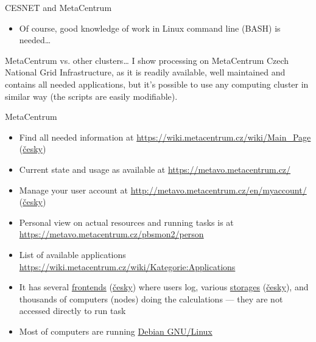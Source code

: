 \documentclass[compress, ucs, xelatex, 11pt, xcolor=x11names, aspectratio=169,
	hyperref={
		bookmarks=true,
		unicode=true,
		colorlinks=true,
		pdftitle={HybSeq course},
		plainpages=false,
		pdfauthor={Vojtech Zeisek},
		pdfsubject={Practical processing of HybSeq target enrichment sequencing data on computing grids like MetaCentrum},
		pdfcreator={XeLaTeX},
		pdfkeywords={BASH, command line, GNU, HybSeq, Linux, MetaCentrum, sequencing shell, target enrichment},
		linkcolor=Turquoise4, %
		anchorcolor=DodgerBlue4, %
		citecolor=DodgerBlue4, %
		filecolor=DodgerBlue4, %
		menucolor=Tan4, %
		urlcolor=DarkOliveGreen4, %
		pdftex},
	url={hyphens, lowtilde} %
	]{beamer}
\begin{document}
\begin{frame}[allowframebreaks]{CESNET and MetaCentrum}
\begin{itemize}
		\item Of course, good knowledge of work in Linux command line (BASH) is needed\ldots
	\end{itemize}
	\vfill
	\begin{alertblock}{MetaCentrum vs. other clusters\ldots}
		I show processing on MetaCentrum Czech National Grid Infrastructure, as it is readily available, well maintained and contains all needed applications, but it's possible to use any computing cluster in similar way (the scripts are easily modifiable).
	\end{alertblock}
	\vfill
\end{frame}

\begin{frame}{MetaCentrum}
	\begin{itemize}
		\item Find all needed information at \url{https://wiki.metacentrum.cz/wiki/Main_Page} (\href{https://wiki.metacentrum.cz/wiki/Hlavn\%C3\%AD_strana}{česky})
		\item Current state and usage as available at \url{https://metavo.metacentrum.cz/}
		\item Manage your user account at \url{http://metavo.metacentrum.cz/en/myaccount/} (\href{https://metavo.metacentrum.cz/cs/myaccount/}{česky})
		\item Personal view on actual resources and running tasks is at \url{https://metavo.metacentrum.cz/pbsmon2/person}
		\item List of available applications \url{https://wiki.metacentrum.cz/wiki/Kategorie:Applications}
		\item It has several \href{https://wiki.metacentrum.cz/wiki/Frontend}{frontends} (\href{https://wiki.metacentrum.cz/wiki/Celni_uzel}{česky}) where users log, various \href{https://wiki.metacentrum.cz/wiki/Working_with_data}{storages} (\href{https://wiki.metacentrum.cz/wiki/Prace_s_daty}{česky}), and thousands of computers (nodes) doing the calculations --- they are not accessed directly to run task
		\item Most of computers are running \href{https://www.debian.org/}{Debian GNU/Linux}
	\end{itemize}
\end{frame}
\end{document}

